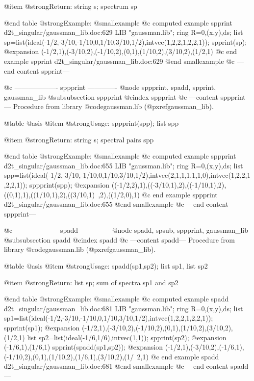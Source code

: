 @item @strong{Return:}
string s; spectrum sp

@end table
@strong{Example:}
@smallexample
@c computed example spprint d2t_singular/gaussman_lib.doc:629 
LIB "gaussman.lib";
ring R=0,(x,y),ds;
list sp=list(ideal(-1/2,-3/10,-1/10,0,1/10,3/10,1/2),intvec(1,2,2,1,2,2,1));
spprint(sp);
@expansion{} (-1/2,1),(-3/10,2),(-1/10,2),(0,1),(1/10,2),(3/10,2),(1/2,1)
@c end example spprint d2t_singular/gaussman_lib.doc:629
@end smallexample
@c ---end content spprint---

@c ------------------- sppprint -------------
@node sppprint, spadd, spprint, gaussman_lib
@subsubsection sppprint
@cindex sppprint
@c ---content sppprint---
Procedure from library @code{gaussman.lib} (@pxref{gaussman_lib}).

@table @asis
@item @strong{Usage:}
sppprint(spp); list spp

@item @strong{Return:}
string s; spectral pairs spp

@end table
@strong{Example:}
@smallexample
@c computed example sppprint d2t_singular/gaussman_lib.doc:655 
LIB "gaussman.lib";
ring R=0,(x,y),ds;
list spp=list(ideal(-1/2,-3/10,-1/10,0,1/10,3/10,1/2),intvec(2,1,1,1,1,1,0),intvec(1,2,2,1,2,2,1));
sppprint(spp);
@expansion{} ((-1/2,2),1),((-3/10,1),2),((-1/10,1),2),((0,1),1),((1/10,1),2),((3/10,1)\
   ,2),((1/2,0),1)
@c end example sppprint d2t_singular/gaussman_lib.doc:655
@end smallexample
@c ---end content sppprint---

@c ------------------- spadd -------------
@node spadd, spsub, sppprint, gaussman_lib
@subsubsection spadd
@cindex spadd
@c ---content spadd---
Procedure from library @code{gaussman.lib} (@pxref{gaussman_lib}).

@table @asis
@item @strong{Usage:}
spadd(sp1,sp2); list sp1, list sp2

@item @strong{Return:}
list sp; sum of spectra sp1 and sp2

@end table
@strong{Example:}
@smallexample
@c computed example spadd d2t_singular/gaussman_lib.doc:681 
LIB "gaussman.lib";
ring R=0,(x,y),ds;
list sp1=list(ideal(-1/2,-3/10,-1/10,0,1/10,3/10,1/2),intvec(1,2,2,1,2,2,1));
spprint(sp1);
@expansion{} (-1/2,1),(-3/10,2),(-1/10,2),(0,1),(1/10,2),(3/10,2),(1/2,1)
list sp2=list(ideal(-1/6,1/6),intvec(1,1));
spprint(sp2);
@expansion{} (-1/6,1),(1/6,1)
spprint(spadd(sp1,sp2));
@expansion{} (-1/2,1),(-3/10,2),(-1/6,1),(-1/10,2),(0,1),(1/10,2),(1/6,1),(3/10,2),(1/\
   2,1)
@c end example spadd d2t_singular/gaussman_lib.doc:681
@end smallexample
@c ---end content spadd---

